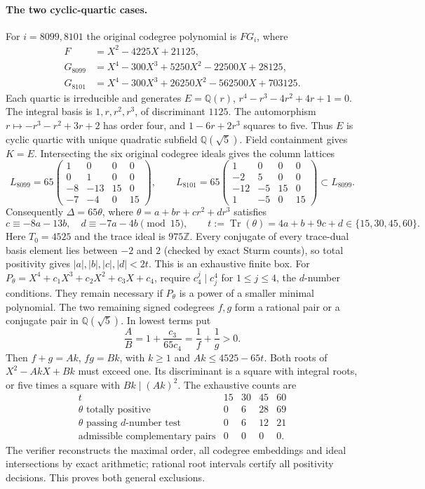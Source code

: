 \paragraph{The two cyclic-quartic cases.}
For $i=8099,8101$ the original codegree polynomial is $F G_i$, where
\[
\begin{split}
 F&=X^2-4225X+21125,\\
 G_{8099}&=X^4-300X^3+5250X^2-22500X+28125,\\
 G_{8101}&=X^4-300X^3+26250X^2-562500X+703125.
\end{split}
\]
Each quartic is irreducible and generates
$E=\mathbb Q(r)$, $r^4-r^3-4r^2+4r+1=0$.
The integral basis is $1,r,r^2,r^3$, of discriminant $1125$.
The automorphism $r\mapsto-r^3-r^2+3r+2$ has order four, and
$1-6r+2r^3$ squares to five. Thus $E$ is cyclic quartic with unique
quadratic subfield $\mathbb Q(\sqrt5)$. Field containment gives $K=E$.
Intersecting the six original codegree ideals gives the column lattices
\[
 L_{8099}=65\begin{pmatrix}1&0&0&0\\0&1&0&0\\-8&-13&15&0\\-7&-4&0&15\end{pmatrix},
 \qquad
 L_{8101}=65\begin{pmatrix}1&0&0&0\\-2&5&0&0\\-12&-5&15&0\\1&-5&0&15\end{pmatrix}
 \subset L_{8099}.
\]
Consequently $\Delta=65\theta$, where
$\theta=a+br+cr^2+dr^3$ satisfies
\[
 c\equiv-8a-13b,\quad d\equiv-7a-4b\pmod{15},\qquad
 t:=\operatorname{Tr}(\theta)=4a+b+9c+d\in\{15,30,45,60\}.
\]
Here $T_0=4525$ and the trace ideal is $975\mathbb Z$.
Every conjugate of every trace-dual basis element lies between $-2$ and
$2$ (checked by exact Sturm counts), so total positivity gives
$|a|,|b|,|c|,|d|<2t$. This is an exhaustive finite box.
For $P_\theta=X^4+c_1X^3+c_2X^2+c_3X+c_4$, require
$c_4^j\mid c_j^4$ for $1\le j\le4$, the $d$-number conditions.
They remain necessary if $P_\theta$ is a power of a smaller minimal
polynomial. The two remaining signed codegrees $f,g$ form a rational
pair or a conjugate pair in $\mathbb Q(\sqrt5)$. In lowest terms put
\[
 \frac AB=1+\frac{c_3}{65c_4}=\frac1f+\frac1g>0.
\]
Then $f+g=Ak$, $fg=Bk$, with $k\ge1$ and $Ak\le4525-65t$.
Both roots of $X^2-AkX+Bk$ must exceed one. Its discriminant is a square
with integral roots, or five times a square with $Bk\mid(Ak)^2$.
The exhaustive counts are
\[
\begin{array}{c|rrrr}
t&15&30&45&60\\\hline
\theta\text{ totally positive}&0&6&28&69\\
\theta\text{ passing }d\text{-number test}&0&6&12&21\\
\text{admissible complementary pairs}&0&0&0&0.
\end{array}
\]
The verifier reconstructs the maximal order, all codegree embeddings and
ideal intersections by exact arithmetic; rational root intervals certify
all positivity decisions. This proves both general exclusions.

